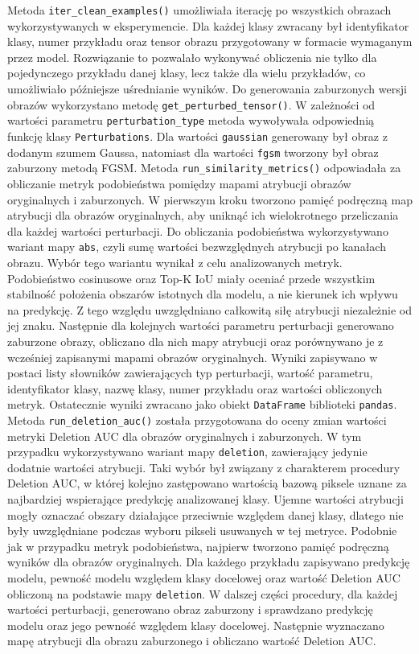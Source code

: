 Metoda \texttt{iter\_clean\_examples()} umożliwiała iterację po wszystkich obrazach wykorzystywanych w eksperymencie. Dla każdej klasy zwracany był identyfikator klasy, numer przykładu oraz tensor obrazu przygotowany w formacie wymaganym przez model. Rozwiązanie to pozwalało wykonywać obliczenia nie tylko dla pojedynczego przykładu danej klasy, lecz także dla wielu przykładów, co umożliwiało późniejsze uśrednianie wyników.
Do generowania zaburzonych wersji obrazów wykorzystano metodę \texttt{get\_perturbed\_tensor()}. W zależności od wartości parametru \texttt{perturbation\_type} metoda wywoływała odpowiednią funkcję klasy \texttt{Perturbations}. Dla wartości \texttt{gaussian} generowany był obraz z dodanym szumem Gaussa, natomiast dla wartości \texttt{fgsm} tworzony był obraz zaburzony metodą FGSM.
Metoda \texttt{run\_similarity\_metrics()} odpowiadała za obliczanie metryk podobieństwa pomiędzy mapami atrybucji obrazów oryginalnych i zaburzonych. W pierwszym kroku tworzono pamięć podręczną map atrybucji dla obrazów oryginalnych, aby uniknąć ich wielokrotnego przeliczania dla każdej wartości perturbacji. Do obliczania podobieństwa wykorzystywano wariant mapy \texttt{abs}, czyli sumę wartości bezwzględnych atrybucji po kanałach obrazu. Wybór tego wariantu wynikał z celu analizowanych metryk. Podobieństwo cosinusowe oraz Top-K IoU miały oceniać przede wszystkim stabilność położenia obszarów istotnych dla modelu, a nie kierunek ich wpływu na predykcję. Z tego względu uwzględniano całkowitą siłę atrybucji niezależnie od jej znaku. 
Następnie dla kolejnych wartości parametru perturbacji generowano zaburzone obrazy, obliczano dla nich mapy atrybucji oraz porównywano je z wcześniej zapisanymi mapami obrazów oryginalnych. Wyniki zapisywano w postaci listy słowników zawierających typ perturbacji, wartość parametru, identyfikator klasy, nazwę klasy, numer przykładu oraz wartości obliczonych metryk. Ostatecznie wyniki zwracano jako obiekt \texttt{DataFrame} biblioteki \texttt{pandas}. Metoda \texttt{run\_deletion\_auc()} została przygotowana do oceny zmian wartości metryki Deletion AUC dla obrazów oryginalnych i zaburzonych. W tym przypadku wykorzystywano wariant mapy \texttt{deletion}, zawierający jedynie dodatnie wartości atrybucji. Taki wybór był związany z charakterem procedury Deletion AUC, w której kolejno zastępowano wartością bazową piksele uznane za najbardziej wspierające predykcję analizowanej klasy. Ujemne wartości atrybucji mogły oznaczać obszary działające przeciwnie względem danej klasy, dlatego nie były uwzględniane podczas wyboru pikseli usuwanych w tej metryce.
Podobnie jak w przypadku metryk podobieństwa, najpierw tworzono pamięć podręczną wyników dla obrazów oryginalnych. Dla każdego przykładu zapisywano predykcję modelu, pewność modelu względem klasy docelowej oraz wartość Deletion AUC obliczoną na podstawie mapy \texttt{deletion}. W dalszej części procedury, dla każdej wartości perturbacji, generowano obraz zaburzony i sprawdzano predykcję modelu oraz jego pewność względem klasy docelowej. Następnie wyznaczano mapę atrybucji dla obrazu zaburzonego i obliczano wartość Deletion AUC.

